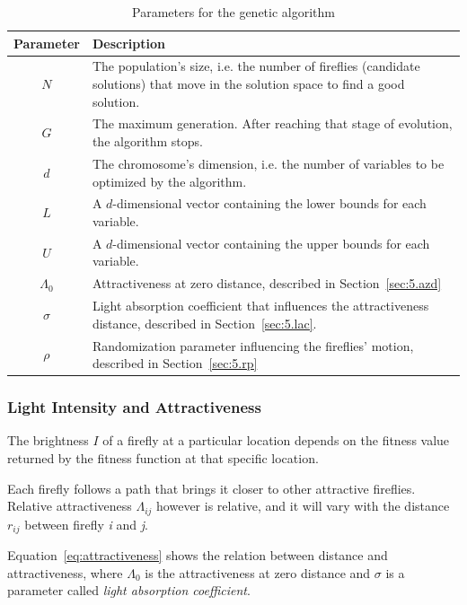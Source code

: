 \begin{table}[]
	\centering
	\begin{tabularx}{\linewidth}{c X}
		\toprule
		\textbf{Parameter} & \textbf{Description} \\ \midrule
		$N$        & The population's size, i.e. the number of fireflies (candidate solutions) that move in the solution space to find a good solution. \\
		$G$         & The maximum generation. After reaching that stage of evolution, the algorithm stops. \\
		$d$           	   & The chromosome's dimension, i.e. the number of variables to be optimized by the algorithm. \\
		$L$           	   & A $d$-dimensional vector containing the lower bounds for each variable. \\
		$U$				   & A $d$-dimensional vector containing the upper bounds for each variable. \\ 
		$\Lambda_0$ & Attractiveness at zero distance, described in Section~\ref{sec:5.azd} \\
		$\sigma$		& Light absorption coefficient that influences the attractiveness distance, described in Section~\ref{sec:5.lac}. \\
		$\rho$ & Randomization parameter influencing the fireflies' motion, described in Section~\ref{sec:5.rp} \\ \bottomrule
	\end{tabularx}
	\caption{Parameters for the genetic algorithm}
	\label{tab:fa_params}
\end{table}

\subsubsection{Light Intensity and Attractiveness}
\label{sec:5.light_attract}

The brightness $I$ of a firefly at a particular location depends
on the fitness value returned by the fitness function at that specific location.

Each firefly follows a path that brings it closer to other
attractive fireflies. Relative attractiveness $\Lambda_{ij}$ however is relative,
and it will vary with the distance $r_{ij}$ between firefly \textit{i} and \textit{j}.

Equation~\ref{eq:attractiveness} shows the relation between distance and attractiveness,
where $\Lambda_0$ is the attractiveness at zero distance and $\sigma$ is
a parameter called \textit{light absorption coefficient}.

